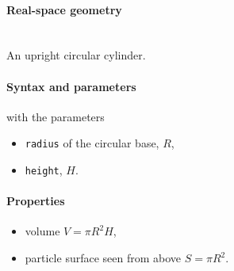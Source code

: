 \paragraph{Real-space geometry}\strut\\
An upright circular cylinder.

\begin{figure}[h]
\hfill
{}
\hfill
{}
\hfill
\end{figure}

\paragraph{Syntax and parameters}
\begin{quote}
\end{quote}
with the parameters
\begin{itemize}
\item \texttt{radius} of the circular base, $R$, 
\item \texttt{height}, $H$.
\end{itemize}

\paragraph{Properties}
\begin{itemize}
\item volume $V = \pi R^2 H$,
\item particle surface seen from above $S=\pi R^2$.

\end{itemize}

